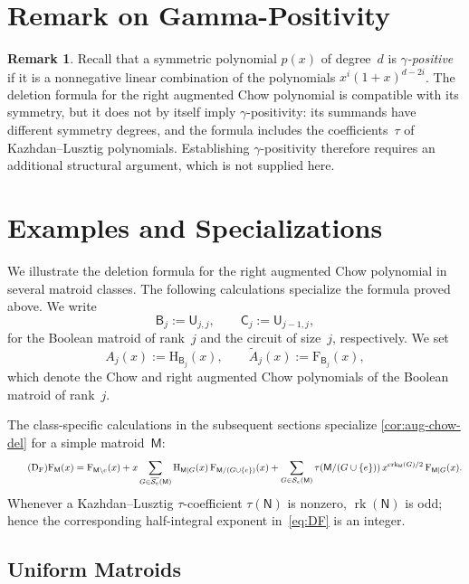 \documentclass[12pt,letterpaper,english]{amsart}
\theoremstyle{teoremas}
\theoremstyle{definition}
\newtheorem{remark}[theorem]{Remark}
\DeclareMathOperator{\rk}{rk}
\DeclareMathOperator{\crk}{crk}
\newcommand{\M}{\mathsf{M}}
\newcommand{\N}{\mathsf{N}}
\newcommand{\U}{\mathsf{U}}
\newcommand{\C}{\mathsf{C}}
\newcommand{\B}{\mathsf{B}}
\renewcommand{\H}{\mathrm{H}}
\newcommand{\FF}{\mathrm{F}}
\newcommand{\Se}{\mathcal{S}_e}
\begin{document}
\section{Remark on Gamma-Positivity}

\begin{remark}\label{rem:gamma-pos}
Recall that a symmetric polynomial $p(x)$ of degree~$d$ is
\emph{$\gamma$-positive} if it is a nonnegative linear combination of
the polynomials $x^i(1+x)^{d-2i}$.
The deletion formula for the right augmented Chow polynomial is
compatible with its symmetry, but it does not by itself imply
$\gamma$-positivity: its summands have different symmetry degrees,
and the formula includes the coefficients~$\tau$ of Kazhdan--Lusztig
polynomials.  Establishing $\gamma$-positivity therefore requires an
additional structural argument, which is not supplied here.
\end{remark}


\section{Examples and Specializations}

We illustrate the deletion formula for the right augmented Chow
polynomial in several matroid classes.  The following calculations
specialize the formula proved above.  We write
\[
\B_j := \U_{j,j},\qquad \C_j := \U_{j-1,j},
\]
for the Boolean matroid of rank~$j$ and the circuit of size~$j$,
respectively.  We set
\[
A_j(x) := \H_{\B_j}(x),\qquad
\widetilde{A}_j(x) := \FF_{\B_j}(x),
\]
which denote the Chow and right augmented Chow polynomials of the
Boolean matroid of rank~$j$.

The class-specific calculations in the subsequent sections specialize
\cref{cor:aug-chow-del} for a simple matroid~$\M$:
\begin{equation}\tag{D$_{\FF}$}\label{eq:DF}
\FF_{\M}(x) = \FF_{\M \setminus e}(x)
  + x \sum_{G \in \overline{\Se}(\M)}
    \H_{\M|G}(x)\, \FF_{\M/(G \cup \{e\})}(x)
  + \sum_{G \in \Se(\M)}
    \tau(\M/(G \cup \{e\}))\, x^{\crk_{\M}(G)/2}\,
    \FF_{\M|G}(x).
\end{equation}
Whenever a Kazhdan--Lusztig $\tau$-coefficient $\tau(\N)$ is nonzero,
$\rk(\N)$ is odd; hence the corresponding half-integral exponent
in~\eqref{eq:DF} is an integer.


\subsection{Uniform Matroids}
\end{document}

